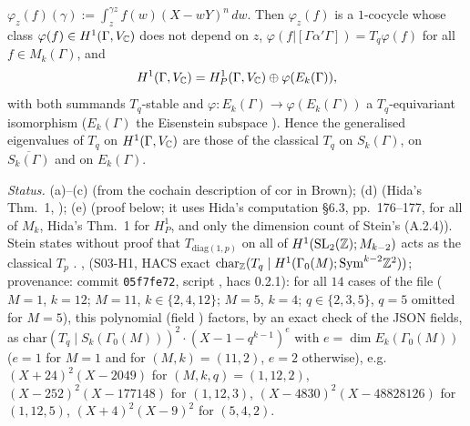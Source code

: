 \begin{lemma}
\begin{enumerate}[label=(\alph*)]
  $\varphi_z(f)(\gamma):=\int_z^{\gamma z}f(w)(X-wY)^n\,dw$. Then $\varphi_z(f)$ is a $1$-cocycle whose class $\varphi(f)\in H^1(\Gamma,V_{\mathbb{C}})$ does not depend on $z$,
  $\varphi(f|[\Gamma\alpha'\Gamma])=T_q\varphi(f)$ for all $f\in M_k(\Gamma)$, and
  \[H^1(\Gamma,V_{\mathbb{C}})=H^1_P(\Gamma,V_{\mathbb{C}})\oplus\varphi(E_k(\Gamma)),\]
  with both summands $T_q$-stable and $\varphi:E_k(\Gamma)\to\varphi(E_k(\Gamma))$ a $T_q$-equivariant isomorphism ($E_k(\Gamma)$ the Eisenstein subspace
  ). Hence the generalised eigenvalues of $T_q$ on $H^1(\Gamma,V_{\mathbb{C}})$ are those of the
  classical $T_q$ on $S_k(\Gamma)$, on $\overline{S_k(\Gamma)}$ and on $E_k(\Gamma)$.
\end{enumerate}
\emph{Status.} (a)--(c) \stproved{} (from the cochain description of $\mathrm{cor}$ in Brown); (d) \stpmc{} (Hida's Thm.~1, \stcited); (e) \stpmc{}
(proof below; it uses Hida's computation \S6.3, pp.~176--177, for all of $M_k$, Hida's Thm.~1 for $H^1_P$, and only the dimension count of Stein's (A.2.4)).
Stein states without proof that $T_{\mathrm{diag}(1,p)}$ on all of $H^1(\mathrm{SL}_2(\mathbb{Z});M_{k-2})$ acts as the classical $T_p$
 \stcited. \stcomp{}, 
(S03-H1, HACS exact $\mathrm{char}_{\mathbb{Z}}(T_q\mid H^1(\Gamma_0(M);\mathrm{Sym}^{k-2}\mathbb{Z}^2))$; provenance: commit \texttt{05f7fe72}, script ,
hacs 0.2.1): for all $14$ cases of the file ($M=1$, $k=12$; $M=11$, $k\in\{2,4,12\}$; $M=5$, $k=4$; $q\in\{2,3,5\}$, $q=5$ omitted for $M=5$), this polynomial (field ) factors, by an exact check of the JSON fields, as
$\mathrm{char}(T_q\mid S_k(\Gamma_0(M)))^2\cdot(X-1-q^{k-1})^{e}$ with $e=\dim E_k(\Gamma_0(M))$ ($e=1$ for $M=1$ and for $(M,k)=(11,2)$, $e=2$ otherwise), e.g.\ $(X+24)^2(X-2049)$ for
$(M,k,q)=(1,12,2)$, $(X-252)^2(X-177148)$ for $(1,12,3)$, $(X-4830)^2(X-48828126)$ for $(1,12,5)$, $(X+4)^2(X-9)^2$ for $(5,4,2)$.
\end{lemma}
